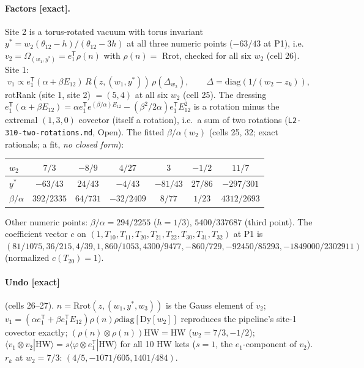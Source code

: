 \documentclass[11pt]{article}
\newcommand{\Om}{\Omega}
\newcommand{\eT}{e_1^{\mathsf T}}
\newcommand{\Tt}[1]{T_{#1}}
\newcommand{\thh}{\theta_{12}}
\newcommand{\ex}{\textbf{[exact]}}
\newcommand{\nb}[1]{\texttt{#1}}
\begin{document}
\paragraph{Factors \ex.} Site 2 is a torus-rotated vacuum with torus invariant $y^*=w_2(\thh-h)/(\thh-3h)$ at all three numeric points ($-63/43$ at P1), i.e.\ $v_2=\Om_{(w_1,y^*)}=\eT\rho(n)$ with $\rho(n)=$ Rrot, checked for all six $w_2$ (cell 26). Site 1:
\[
v_1\propto\eT(\alpha+\beta E_{12})\,R(z,(w_1,y^*))\,\rho(\Delta_{w_2}),\qquad\Delta=\mathrm{diag}(1/(w_2-z_k)),
\]
rotRank (site 1, site 2) $=(5,4)$ at all six $w_2$ (cell 25). The dressing $\eT(\alpha+\beta E_{12})=\alpha\eT e^{(\beta/\alpha)E_{12}}-(\beta^2/2\alpha)\eT E_{12}^2$ is a rotation minus the extremal $(1,3,0)$ covector (itself a rotation), i.e.\ a sum of two rotations (\nb{L2-310-two-rotations.md}, Open). The fitted $\beta/\alpha(w_2)$ (cells 25, 32; exact rationals; a fit, \emph{no closed form}):
\begin{center}\small
\begin{tabular}{@{}lcccccc@{}}\toprule
$w_2$ & $7/3$ & $-8/9$ & $4/27$ & $3$ & $-1/2$ & $11/7$\\\midrule
$y^*$ & $-63/43$ & $24/43$ & $-4/43$ & $-81/43$ & $27/86$ & $-297/301$\\
$\beta/\alpha$ & $392/2335$ & $64/731$ & $-32/2409$ & $8/77$ & $1/23$ & $4312/2693$\\\bottomrule
\end{tabular}
\end{center}
Other numeric points: $\beta/\alpha=294/2255$ ($h=1/3$), $5400/337687$ (third point). The coefficient vector $c$ on $(1,\Tt{10},\Tt{11},\Tt{20},\Tt{21},\Tt{22},\Tt{30},\Tt{31},\Tt{32})$ at P1 is $(81/1075,36/215,4/39,1,860/1053,4300/9477,-860/729,-92450/85293,-1849000/2302911)$ (normalized $c(\Tt{20})=1$).

\paragraph{Undo \ex} (cells 26--27). $n=\mathrm{Rrot}(z,(w_1,y^*,w_3))$ is the Gauss element of $v_2$; $v_1=(\alpha\eT+\beta\eT E_{12})\rho(n)\rho\mathrm{diag}[\mathrm{Dy}[w_2]]$ reproduces the pipeline's site-1 covector exactly; $(\rho(n)\otimes\rho(n))\mathrm{HW}=\mathrm{HW}$ ($w_2=7/3,-1/2$); $\langle v_1\otimes v_2|\mathrm{HW}\rangle=s\langle\varphi\otimes\eT|\mathrm{HW}\rangle$ for all 10 HW kets ($s=1$, the $e_1$-component of $v_2$). $r_k$ at $w_2=7/3$: $(4/5,-1071/605,1401/484)$.
\end{document}
